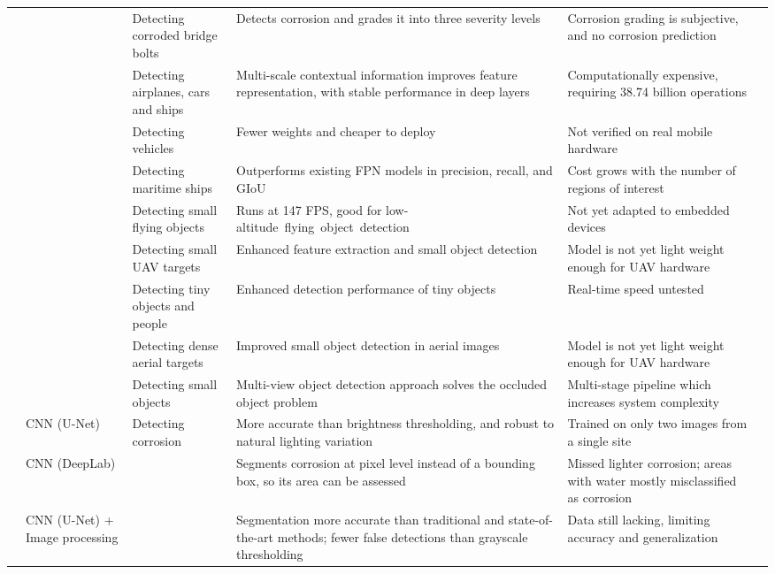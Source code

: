 {\begin{xltabular}{\textwidth}{>{\RaggedRight\arraybackslash}p{1.6cm}>{\RaggedRight\arraybackslash}p{2.2cm}>{\RaggedRight\arraybackslash}p{2.3cm}>{\RaggedRight\arraybackslash}X>{\RaggedRight\arraybackslash}Xp{0.95cm}}
 &  & Detecting corroded bridge bolts & Detects corrosion and grades it into three severity levels & Corrosion grading is subjective, and no corrosion prediction & \citep{Li2024b} \\
 &  & Detecting airplanes, cars and ships & Multi-scale contextual information improves feature representation, with stable performance in deep layers & Computationally expensive, requiring 38.74 billion operations & \citep{Han2022} \\
 &  & Detecting vehicles & Fewer weights and cheaper to deploy & Not verified on real mobile hardware & \citep{Liu2026a} \\
 &  & Detecting maritime ships & Outperforms existing FPN models in precision, recall, and GIoU & Cost grows with the number of regions of interest & \citep{Mbietieu2025} \\
 &  & Detecting small flying objects & Runs at 147 FPS, good for low-altitude flying object detection & Not yet adapted to embedded devices & \citep{Tao2021} \\
 &  & Detecting small UAV targets & Enhanced feature extraction and small object detection & Model is not yet light weight enough for UAV hardware & \citep{Jiang2025} \\
 &  & Detecting tiny objects and people & Enhanced detection performance of tiny objects & Real-time speed untested & \citep{Chen2025} \\
 &  & Detecting dense aerial targets & Improved small object detection in aerial images & Model is not yet light weight enough for UAV hardware & \citep{Sun2023} \\
 &  & Detecting  small objects & Multi-view object detection approach solves the occluded object problem & Multi-stage pipeline which increases system complexity & \citep{Zheng2023} \\
 & CNN (U-Net) & Detecting corrosion & More accurate than brightness thresholding, and robust to natural lighting variation & Trained on only two images from a single site & \citep{Suzuki2026} \\
 & CNN (DeepLab) &  & Segments corrosion at pixel level instead of a bounding box, so its area can be assessed & Missed lighter corrosion; areas with water mostly misclassified as corrosion & \citep{Rahman2021} \\
 & CNN (U-Net) + Image processing &  & Segmentation more accurate than traditional and state-of-the-art methods; fewer false detections than grayscale thresholding & Data still lacking, limiting accuracy and generalization & \citep{Hu2023} \\

\end{xltabular}}
